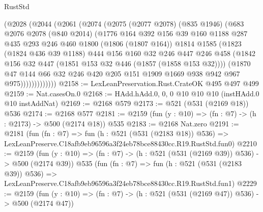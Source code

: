 \begin{lexlean}{RustStd}
\begin{coremodule}
            (@2028
              (@2044
                (@2061
                  (@2074
                    (@2075
                      (@2077 @2078)
                      (@835 @1946)
                      (@683
                        @2076
                        @2078
                        (@840 @2014)
                        (@1776
                          @164
                          @392
                          @156
                          @39
                          @160
                          @1188
                          @287
                          @435
                          @293
                          @246
                          @460
                          @1800
                          (@1806 (@1807 @164))
                          @1814
                          @1585
                          (@1823
                            (@1824 @436 @39 @1188)
                            @444
                            @156
                            @160
                            @32
                            @246
                            @447
                            @246
                            @458
                            (@1842 @156 @32 @447 (@1851 @153 @32 @446 (@1857 (@1858 @153 @32))))
                            (@1870
                              @47
                              @144
                              @66
                              @32
                              @246
                              @420
                              @205
                              @151
                              @1909
                              @1669
                              @938
                              @942
                              @967
                              @975)))))))))))))
@2158 := LexLeanPreservation.Rust.CrateOK @495 @497 @499
@2159 := Nat.casesOn.{0}
@2168 := HAdd.hAdd.{0, 0, 0} @10 @10 @10 (instHAdd.{0} @10 instAddNat)
@2169 := @2168 @579
@2173 := @521 (@531 (@2169 @18)) @536
@2174 := @2168 @577
@2181 := @2159 (fun (y : @10) => (fn : @7) -> (h : @2173) -> @500 (@2174 @18)) @535
@2183 := @2168 Nat.zero
@2191 := @2181
    (fun (fn : @7) =>
    fun (h : @521 (@531 (@2183 @18)) @536) =>
    LexLeanPreserve.C18afb9eb96596a3f24eb78bce88430cc.R19.RustStd.fun0)
@2210 := @2159
    (fun (y : @10) => (fn : @7) -> (h : @521 (@531 (@2169 @39)) @536) -> @500 (@2174 @39))
    @535
    (fun (fn : @7) =>
    fun (h : @521 (@531 (@2183 @39)) @536) =>
    LexLeanPreserve.C18afb9eb96596a3f24eb78bce88430cc.R19.RustStd.fun1)
@2229 := @2159
    (fun (y : @10) => (fn : @7) -> (h : @521 (@531 (@2169 @47)) @536) -> @500 (@2174 @47))

\end{coremodule}
\end{lexlean}
